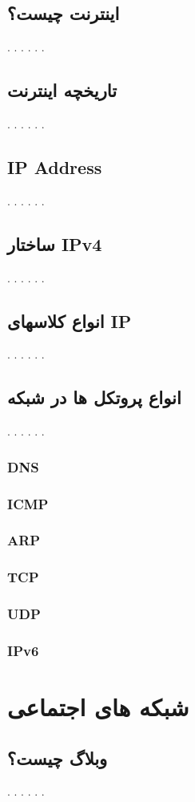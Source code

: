 \documentclass[12pt]{book}
\begin{document}
\section{اینترنت چیست؟}
. . . . . .
\section{تاریخچه اینترنت}
. . . . . .
\section{IP Address}
. . . . . .
\section{ساختار IPv4}
. . . . . .
\section{انواع کلاسهای IP}
. . . . . .
\section{انواع پروتکل ها در شبکه}
. . . . . .
\subsection{DNS}
\subsection{ICMP}
\subsection{ARP}
\subsection{TCP}
\subsection{UDP}
\subsection{IPv6}


\newpage
\chapter{شبکه های اجتماعی}

\section{وبلاگ چیست؟}
. . . . . .
\end{document}
